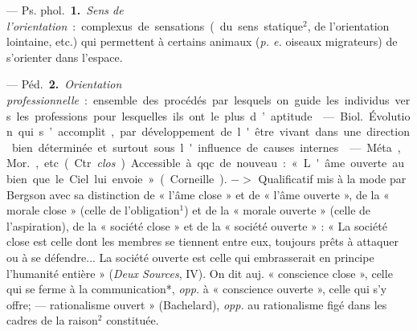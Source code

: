 \begin{itemize}[leftmargin=1cm, label=, itemsep=1pt]
 — \si{Ps. phol.} {\bf 1.} {\it Sens de l'orientation} :
complexus de sensations (du sens statique$^2$, de l’orientation lointaine,
etc.) qui permettent à certains animaux ({\it p. e.} oiseaux migrateurs) de
s'orienter dans l’espace.

— \si{Péd.} {\bf 2.} {\it Orientation professionnelle} : ensemble des
procédés par lesquels on guide les individus vers les professions pour
lesquelles ils ont le plus d’aptitude.

 — \si{Biol.} Évolution qui s’accomplit, par développement de
l'être vivant dans une direction bien déterminée et surtout sous l'influence
de causes internes.

 — Méta, \si{Mor.}, etc. (Ctr. {\it clos}). Accessible à qqc. de
nouveau : « L'âme ouverte au bien que le Ciel lui envoie » (Corneille). $->$
Qualificatif mis à la mode par Bergson avec sa distinction de « l’âme close »
et de « l'âme ouverte », de la « morale close » (celle de l'obligation$^1$)
et de la « morale ouverte » (celle de l’aspiration), de la « société close »
et de la « société ouverte » : « La société close est celle dont les membres
se tiennent entre eux, toujours prêts à attaquer ou à se défendre... La
société ouverte est celle qui embrasserait en principe l'humanité entière
» ({\it Deux Sources}, IV). On dit auj. « conscience close », celle qui se
ferme à la communication*, {\it opp.} à « conscience ouverte », celle qui s’y
offre; — rationalisme ouvert » (Bachelard), {\it opp.} au rationalisme figé
dans les cadres de la raison$^2$ constituée.

	\end{itemize}

